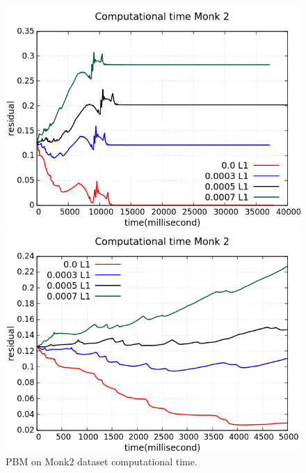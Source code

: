 \begin{figure}[H]
	\centering
	\begin{minipage}[t]{0.5\linewidth}
		\includegraphics[width=\linewidth]{data/PBM/Monk2/Monk2_PBM_CT_standard.png}
	\end{minipage}%
	\begin{minipage}[t]{0.5\linewidth}
		\includegraphics[width=\linewidth]{data/PBM/Monk2/Monk2_PBM_CT_zoom.png}
	\end{minipage}
	\caption{PBM on Monk2 dataset computational time.}
\end{figure}
